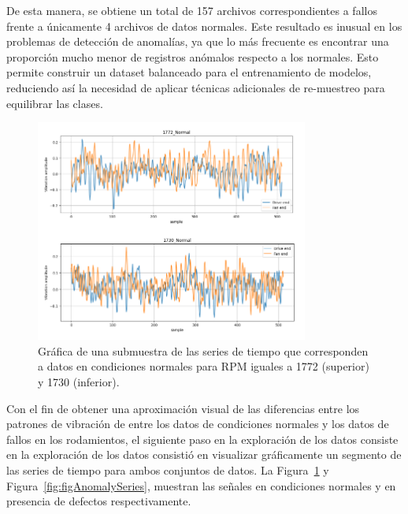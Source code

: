 \documentclass[11pt,a4paper,spanish]{book}
\numberwithin{equation}{chapter}
\numberwithin{figure}{chapter}
\begin{document}
De esta manera, se obtiene un total de 157 archivos correspondientes a fallos frente a únicamente 4 archivos de datos normales. Este resultado es inusual en los problemas de detección de anomalías, ya que lo más frecuente es encontrar una proporción mucho menor de registros anómalos respecto a los normales. Esto permite construir un dataset balanceado para el entrenamiento de modelos, reduciendo así la necesidad de aplicar técnicas adicionales de re-muestreo para equilibrar las clases.


\begin{figure}[h]
    \centering
    \includegraphics[width=0.8\textwidth]{media/dataset/normal-series.png}
    \caption{Gráfica de una submuestra de las series de tiempo que corresponden a datos en condiciones normales para RPM iguales a 1772 (superior) y 1730 (inferior). }
    \label{fig:figNormalSeries}
\end{figure}


Con el fin de obtener una aproximación visual de las diferencias entre los patrones de vibración de entre los datos de condiciones normales y los datos de fallos en los rodamientos, el siguiente paso en la exploración de los datos consiste en la exploración de los datos consistió en visualizar gráficamente un segmento de las series de tiempo para ambos conjuntos de datos. La Figura~\ref{fig:figNormalSeries} y Figura~\ref{fig:figAnomalySeries}, muestran las señales en condiciones normales y en presencia de defectos respectivamente. 
\end{document}
